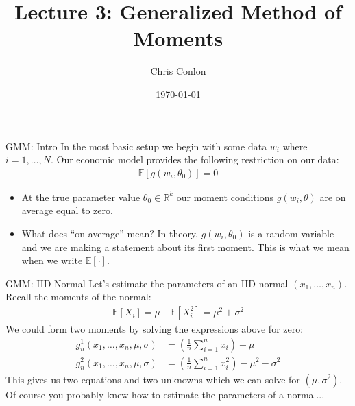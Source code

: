 

\title{Lecture 3: Generalized Method of Moments}
\author{Chris Conlon }


\date{\today}


\maketitle

\begin{frame}{GMM: Intro}
In the most basic setup we begin with some data $w_i$ where $i=1,\ldots,N$. Our economic model provides the following restriction on our data:
\begin{align*}
\mathbb{E}[g(w_i, \theta_0) ] =0
\end{align*}
\begin{itemize}
\item At the true parameter value $\theta_0\in \mathbb{R}^k$ our moment conditions $g(w_i,\theta)$ are on average equal to zero. 
\item What does ``on average'' mean?  In theory, $g(w_i,\theta_0)$ is a random variable and we are making a statement about its first moment.  This is what we mean when we write $\mathbb{E}[\cdot]$.
\end{itemize}
 \end{frame}
 
 \begin{frame}{GMM: IID Normal}
 Let's estimate the parameters of an IID normal $(x_1, \ldots, x_n)$. Recall the moments of the normal:
 \begin{align*}
 \mathbb{E}[X_i] = \mu \quad \mathbb{E}[X_i^2] = \mu^2 + \sigma^2
 \end{align*}
 We could form two moments by solving the expressions above for zero:
 \begin{align*}
 g_n^1(x_1,\ldots,x_n, \mu,\sigma)  &=  \left(\frac{1}{n} \sum_{i=1}^n x_i\right) - \mu\\
 g_n^2(x_1,\ldots,x_n, \mu,\sigma)  &=  \left(\frac{1}{n} \sum_{i=1}^n x_i^2 \right) - \mu^2 - \sigma^2
 \end{align*}
 This gives us two equations and two unknowns which we can solve for $(\mu,\sigma^2)$.\\
 Of course you probably knew how to estimate the parameters of a normal...
 \end{frame}
 
